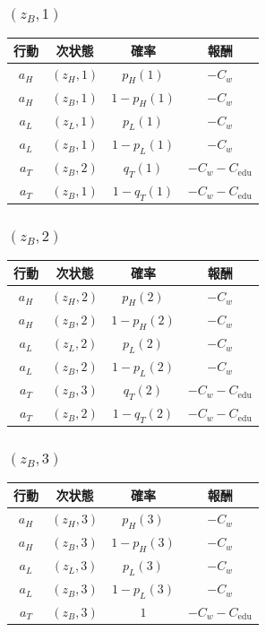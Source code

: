 \documentclass[11pt,a4paper]{bxjsarticle}
\begin{document}
\subsubsection*{\((z_B,1)\)}
\begin{table}[H]
\centering
\begin{tabular}{cccc}
\toprule
行動 & 次状態 & 確率 & 報酬 \\
\midrule
\(a_H\) & \((z_H,1)\) & \(p_H(1)\) & \(-C_w\) \\
\(a_H\) & \((z_B,1)\) & \(1-p_H(1)\) & \(-C_w\) \\
\(a_L\) & \((z_L,1)\) & \(p_L(1)\) & \(-C_w\) \\
\(a_L\) & \((z_B,1)\) & \(1-p_L(1)\) & \(-C_w\) \\
\(a_T\) & \((z_B,2)\) & \(q_T(1)\) & \(-C_w-C_{\mathrm{edu}}\) \\
\(a_T\) & \((z_B,1)\) & \(1-q_T(1)\) & \(-C_w-C_{\mathrm{edu}}\) \\
\bottomrule
\end{tabular}
\end{table}

\subsubsection*{\((z_B,2)\)}
\begin{table}[H]
\centering
\begin{tabular}{cccc}
\toprule
行動 & 次状態 & 確率 & 報酬 \\
\midrule
\(a_H\) & \((z_H,2)\) & \(p_H(2)\) & \(-C_w\) \\
\(a_H\) & \((z_B,2)\) & \(1-p_H(2)\) & \(-C_w\) \\
\(a_L\) & \((z_L,2)\) & \(p_L(2)\) & \(-C_w\) \\
\(a_L\) & \((z_B,2)\) & \(1-p_L(2)\) & \(-C_w\) \\
\(a_T\) & \((z_B,3)\) & \(q_T(2)\) & \(-C_w-C_{\mathrm{edu}}\) \\
\(a_T\) & \((z_B,2)\) & \(1-q_T(2)\) & \(-C_w-C_{\mathrm{edu}}\) \\
\bottomrule
\end{tabular}
\end{table}

\subsubsection*{\((z_B,3)\)}
\begin{table}[H]
\centering
\begin{tabular}{cccc}
\toprule
行動 & 次状態 & 確率 & 報酬 \\
\midrule
\(a_H\) & \((z_H,3)\) & \(p_H(3)\) & \(-C_w\) \\
\(a_H\) & \((z_B,3)\) & \(1-p_H(3)\) & \(-C_w\) \\
\(a_L\) & \((z_L,3)\) & \(p_L(3)\) & \(-C_w\) \\
\(a_L\) & \((z_B,3)\) & \(1-p_L(3)\) & \(-C_w\) \\
\(a_T\) & \((z_B,3)\) & \(1\) & \(-C_w-C_{\mathrm{edu}}\) \\
\bottomrule
\end{tabular}
\end{table}
\end{document}
